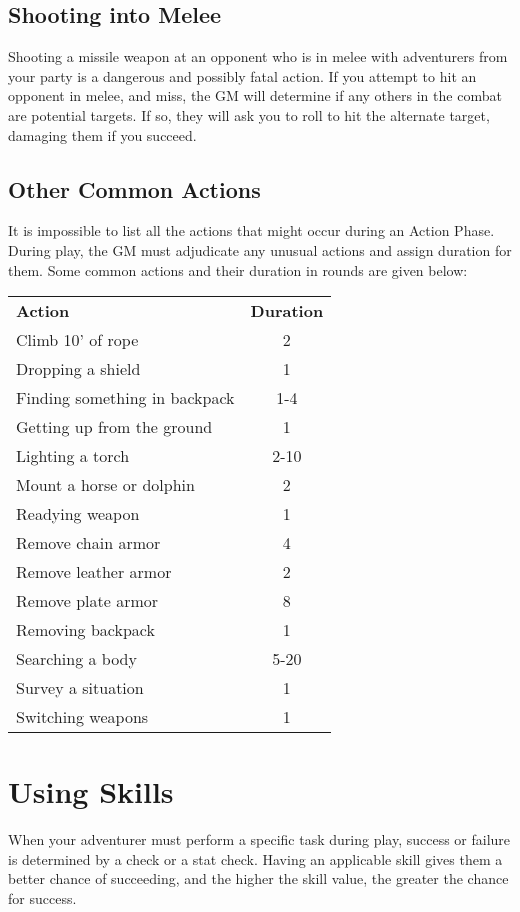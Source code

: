 \begin{multicols}{2}
\subsection{Shooting into Melee}
Shooting a missile weapon at an opponent who is in melee with adventurers from your party is a dangerous and possibly fatal action. If you attempt to hit an opponent in
melee, and miss, the GM will determine if any others in the combat are potential targets. If so, they will ask you to roll to hit the alternate target, damaging them if you succeed. 
\subsection{Other Common Actions}
It is impossible to list all the actions that might occur during an Action Phase. During play, the GM must adjudicate any unusual actions and assign duration for them. Some common actions and their duration in rounds are given below:
\begin{normboxc}
\small
\begin{tabular}{@{}l c}
\textbf{Action} & \textbf{Duration}\\
Climb 10' of rope & 2\\
Dropping a shield & 1\\
Finding something in backpack & 1-4\\
Getting up from the ground & 1\\
Lighting a torch & 2-10\\
Mount a horse or dolphin & 2\\
Readying weapon & 1\\
Remove chain armor & 4\\
Remove leather armor & 2\\
Remove plate armor & 8\\
Removing backpack & 1\\
Searching a body & 5-20\\
Survey a situation & 1\\
Switching weapons & 1\\
\end{tabular}
\end{normboxc}
\section{Using Skills}
When your adventurer must perform a specific task during play, success or failure is determined by a  check or a stat check. Having an applicable skill gives them a better chance of succeeding, and the higher the skill value, the greater the chance for success.


\end{multicols}
